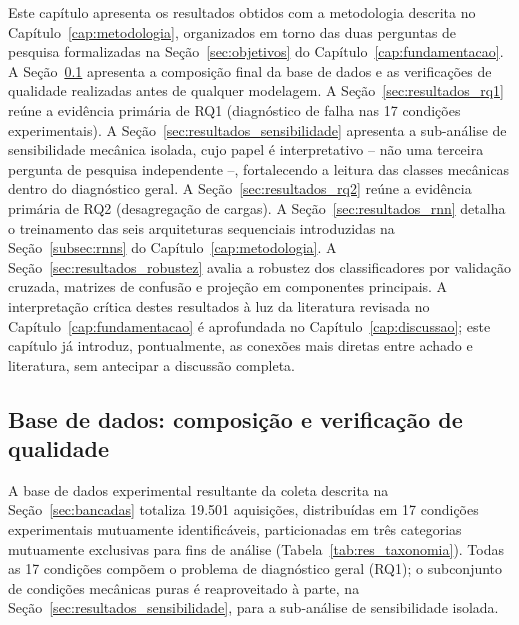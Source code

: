 \documentclass[times,final]{elsarticle}
\begin{document}
Este capítulo apresenta os resultados obtidos com a metodologia descrita no Capítulo~\ref{cap:metodologia}, organizados em torno das duas perguntas de pesquisa formalizadas na Seção~\ref{sec:objetivos} do Capítulo~\ref{cap:fundamentacao}. A Seção~\ref{sec:resultados_bd} apresenta a composição final da base de dados e as verificações de qualidade realizadas antes de qualquer modelagem. A Seção~\ref{sec:resultados_rq1} reúne a evidência primária de RQ1 (diagnóstico de falha nas 17 condições experimentais). A Seção~\ref{sec:resultados_sensibilidade} apresenta a sub-análise de sensibilidade mecânica isolada, cujo papel é interpretativo -- não uma terceira pergunta de pesquisa independente --, fortalecendo a leitura das classes mecânicas dentro do diagnóstico geral. A Seção~\ref{sec:resultados_rq2} reúne a evidência primária de RQ2 (desagregação de cargas). A Seção~\ref{sec:resultados_rnn} detalha o treinamento das seis arquiteturas sequenciais introduzidas na Seção~\ref{subsec:rnns} do Capítulo~\ref{cap:metodologia}. A Seção~\ref{sec:resultados_robustez} avalia a robustez dos classificadores por validação cruzada, matrizes de confusão e projeção em componentes principais. A interpretação crítica destes resultados à luz da literatura revisada no Capítulo~\ref{cap:fundamentacao} é aprofundada no Capítulo~\ref{cap:discussao}; este capítulo já introduz, pontualmente, as conexões mais diretas entre achado e literatura, sem antecipar a discussão completa.

\subsection{Base de dados: composição e verificação de qualidade}
\label{sec:resultados_bd}

A base de dados experimental resultante da coleta descrita na Seção~\ref{sec:bancadas} totaliza 19.501 aquisições, distribuídas em 17 condições experimentais mutuamente identificáveis, particionadas em três categorias mutuamente exclusivas para fins de análise (Tabela~\ref{tab:res_taxonomia}). Todas as 17 condições compõem o problema de diagnóstico geral (RQ1); o subconjunto de condições mecânicas puras é reaproveitado à parte, na Seção~\ref{sec:resultados_sensibilidade}, para a sub-análise de sensibilidade isolada.
\end{document}
